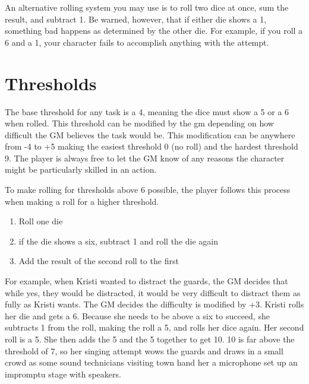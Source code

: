 \begin{flushleft}
An alternative rolling system you may use is to roll two dice at once, sum the
result, and subtract 1. Be warned, however, that if either die shows a 1,
something bad happens as determined by the other die. For example, if you
roll a 6 and a 1, your character fails to accomplish anything with the attempt.

\section*{Thresholds}
The base threshold for any task is a 4, meaning  the dice must show a 5 or a 6
when rolled. This threshold can be modified by the gm depending on how
difficult the GM believes the task would be. This modification can be anywhere
from -4 to +5 making the easiest threshold 0 (no roll) and the hardest
threshold 9. The player is always free to let the GM know of any reasons the
character might be particularly skilled in an action.

To make rolling for thresholds above 6 possible, the player follows this
process when making a roll for a higher threshold.

\begin{enumerate}
    \item{Roll one die}
    \item{if the die shows a six, subtract 1 and roll the die again}
    \item{Add the result of the second roll to the first}
\end{enumerate}

For example, when Kristi wanted to distract the guards, the GM decides that
while yes, they would be distracted, it would be very difficult to distract
them as fully as Kristi wants. The GM decides the difficulty is modified by
+3. Kristi rolls her die and gets a 6. Because she needs to be above a six
to succeed, she subtracts 1 from the roll, making the roll a 5, and rolls her
dice again. Her second roll is a 5. She then adds the 5 and the 5 together to
get 10. 10 is far above the threshold of 7, so her singing attempt wows the
guards and draws in a small crowd as some sound technicians visiting town hand
her a microphone set up an impromptu stage with speakers.

\end{flushleft}
